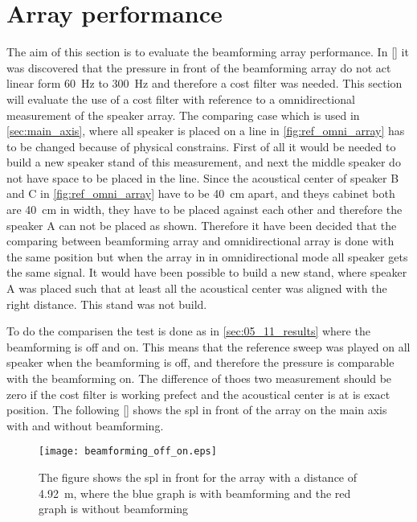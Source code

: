 \section{Array performance}

The aim of this section is to evaluate the beamforming array performance. In \autoref{} it was discovered that the pressure in front of the beamforming array do not act linear form \SI{60}{\hertz} to \SI{300}{\hertz} and therefore a cost filter was needed. This section will evaluate the use of a cost filter with reference to a omnidirectional measurement of the speaker array. The comparing case which is used in \autoref{sec:main_axis}, where all speaker is placed on a line in \autoref{fig:ref_omni_array} has to be changed because of physical constrains. First of all it would be needed to build a new speaker stand of this measurement, and next the middle speaker do not have space to be placed in the line. Since the acoustical center of speaker B and C in \autoref{fig:ref_omni_array} have to be \SI{40}{\centi\meter} apart, and theys cabinet both are \SI{40}{\centi\meter} in width, they have to be placed against each other and therefore the speaker A can not be placed as shown. Therefore it have been decided that the comparing between beamforming array and omnidirectional array is done with the same position but when the array in in omnidirectional mode all speaker gets the same signal. It would have been possible to build a new stand, where speaker A was placed such that at  least all the acoustical center was aligned with the right distance. This stand was not build.

To do the comparisen the test is done as in \autoref{sec:05_11_results} where the beamforming is off and on. This means that the reference sweep was played on all speaker when the beamforming is off, and therefore the pressure is comparable with the beamforming on. The difference of thoes two measurement should be zero if the cost filter is working prefect and the acoustical center is at is exact position. The following \autoref{} shows the \gls{spl} in front of the array on the main axis with and without beamforming.

  \begin{figure}[H]
	\centering
	\texttt{[image: beamforming\_off\_on.eps]}
	\caption{The figure shows the \gls{spl} in front for the array with a distance of \SI{4.92}{\meter}, where the blue graph is with beamforming and the red graph is without beamforming}
		\label{fig:beamforming_off_on}
\end{figure}








